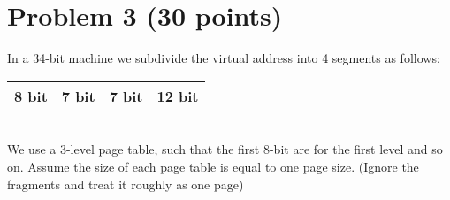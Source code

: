 \documentclass[answers]{exam}
\begin{document}
\vspace{12mm}

\section*{Problem 3 (30 points)}
In a 34-bit machine we subdivide the virtual address into 4 segments as follows:\\
\begin{table}[h!]
  \begin{center}
  \setlength{\tabcolsep}{7mm}
    \begin{tabular}{|c|c|c|c|} 
      \hline
      8 bit &	7 bit &	7 bit &	12 bit\\
      \hline
    \end{tabular}
  \end{center}
\end{table}
\\We use a 3-level page table, such that the first 8-bit are for the first level and so on. Assume the size of each page table is equal to one page size. (Ignore the fragments and treat it roughly as one page)
\end{document}

